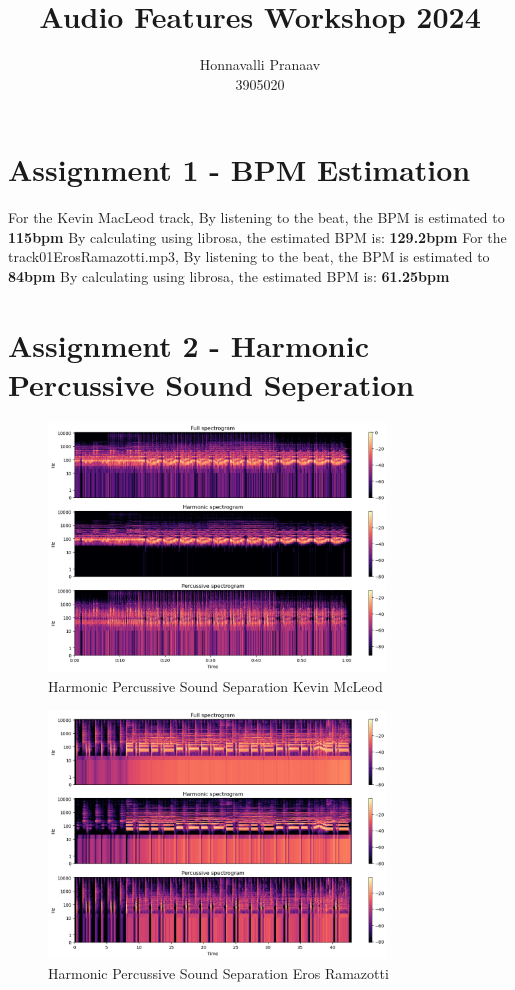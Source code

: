 \documentclass[a4paper, 12pt]{article}
\title{Audio Features Workshop 2024}
\author{Honnavalli Pranaav \\ 3905020}
\date{}
\begin{document}
\maketitle

\section*{Assignment 1 - BPM Estimation}
For the Kevin MacLeod track,
By listening to the beat, the BPM is estimated to \textbf{115bpm}
By calculating using librosa, the estimated BPM is: \textbf{129.2bpm}
\newline
For the track01ErosRamazotti.mp3,
By listening to the beat, the BPM is estimated to \textbf{84bpm}
By calculating using librosa, the estimated BPM is: \textbf{61.25bpm}

\section*{Assignment 2 - Harmonic Percussive Sound Seperation}
\begin{figure}[h!]
    \centering
    \includegraphics[width=0.8\textwidth]{./images/hprss-mcleod-output.png}
    \caption{Harmonic Percussive Sound Separation Kevin McLeod}
    \label{fig:hpssmcleod}
\end{figure}

\begin{figure}[h!]
    \centering
    \includegraphics[width=0.8\textwidth]{./images/hprss-track01-output.png}
    \caption{Harmonic Percussive Sound Separation Eros Ramazotti}
    \label{fig:hpsseros}
\end{figure}
\end{document}
